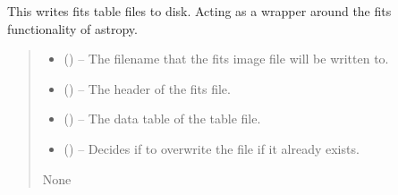 \documentclass[letterpaper,11pt,english]{sphinxmanual}
\begin{document}

\begin{savenotes}\begin{fulllineitems}
\label{\detokenize{code/opihiexarata.library.fits:opihiexarata.library.fits.write_fits_table_file}}
\pysigstartsignatures
{}
\pysigstopsignatures
\sphinxAtStartPar
This writes fits table files to disk. Acting as a wrapper around the
fits functionality of astropy.
\begin{quote}\begin{description}
\begin{itemize}
\item {} 
\sphinxAtStartPar
{} () – The filename that the fits image file will be written to.

\item {} 
\sphinxAtStartPar
{} () – The header of the fits file.

\item {} 
\sphinxAtStartPar
{} () – The data table of the table file.

\item {} 
\sphinxAtStartPar
{} (\sphinxstyleliteralemphasis{\sphinxupquote{, }}) – Decides if to overwrite the file if it already exists.

\end{itemize}

\sphinxAtStartPar
None

\end{description}\end{quote}

\end{fulllineitems}\end{savenotes}
\end{document}
